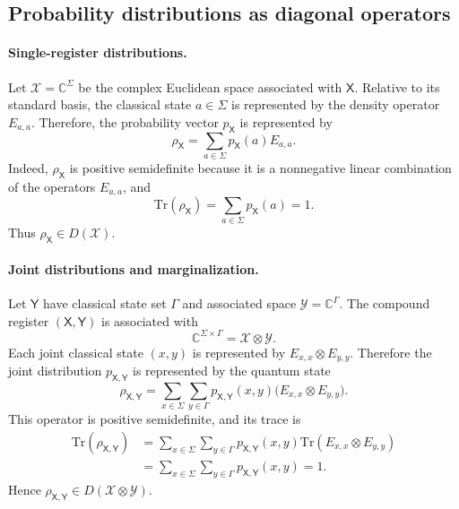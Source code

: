 \documentclass[
    aps,
    pra,
    reprint,
    superscriptaddress,
    nofootinbib
]{revtex4-2}
\theoremstyle{definition}
\theoremstyle{plain}
\begin{document}
\subsection{Probability distributions as diagonal operators}
\label{subsec:p-to-quantum-state}

\paragraph{Single-register distributions.}

Let $\mathcal{X}=\mathbb{C}^{\Sigma}$ be the complex Euclidean space
associated with $\mathsf{X}$. Relative to its standard basis, the classical
state $a\in\Sigma$ is represented by the density operator $E_{a,a}$.
Therefore, the probability vector $p_{\mathsf{X}}$ is represented by
\begin{equation}
    \rho_{\mathsf{X}}
    =
    \sum_{a\in\Sigma}p_{\mathsf{X}}(a)E_{a,a}.
    \label{eq:dop}
\end{equation}
Indeed, $\rho_{\mathsf{X}}$ is positive semidefinite because it is a
nonnegative linear combination of the operators $E_{a,a}$, and
\begin{equation}
    \mathrm{Tr}(\rho_{\mathsf{X}})
    =
    \sum_{a\in\Sigma}p_{\mathsf{X}}(a)
    =
    1.
\end{equation}
Thus $\rho_{\mathsf{X}}\in D(\mathcal{X})$.

\paragraph{Joint distributions and marginalization.}

Let $\mathsf{Y}$ have classical state set $\Gamma$ and associated space
$\mathcal{Y}=\mathbb{C}^{\Gamma}$. The compound register
$(\mathsf{X},\mathsf{Y})$ is associated with
\begin{equation}
    \mathbb{C}^{\Sigma\times\Gamma}
    =
    \mathcal{X}\otimes\mathcal{Y}.
\end{equation}
Each joint classical state $(x,y)$ is represented by
$E_{x,x}\otimes E_{y,y}$. Therefore the joint distribution
$p_{\mathsf{X},\mathsf{Y}}$ is represented by the quantum state
\begin{equation}
    \rho_{\mathsf{X},\mathsf{Y}}
    =
    \sum_{x\in\Sigma}\sum_{y\in\Gamma}
    p_{\mathsf{X},\mathsf{Y}}(x,y)
    \bigl(E_{x,x}\otimes E_{y,y}\bigr).
\end{equation}
This operator is positive semidefinite, and its trace is
\begin{equation}
    \begin{aligned}
        \mathrm{Tr}(\rho_{\mathsf{X},\mathsf{Y}})
        &=
        \sum_{x\in\Sigma}\sum_{y\in\Gamma}
        p_{\mathsf{X},\mathsf{Y}}(x,y)
        \mathrm{Tr}(E_{x,x}\otimes E_{y,y})\\
        &=
        \sum_{x\in\Sigma}\sum_{y\in\Gamma}
        p_{\mathsf{X},\mathsf{Y}}(x,y)
        =
        1.
    \end{aligned}
\end{equation}
Hence
$\rho_{\mathsf{X},\mathsf{Y}}\in
D(\mathcal{X}\otimes\mathcal{Y})$.
\end{document}
